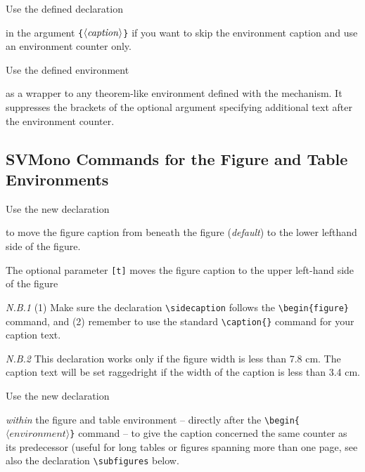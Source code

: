 \documentclass[graybox,square]{svmono}
\begin{document}
\begin{sloppy}
Use the defined declaration
\cprotect\boxtext{\verb|\nocaption|}

in the argument \verb|{|$\langle {\it caption}\rangle$\verb|}| if you want to skip the environment caption and use an environment counter only.

Use the defined environment
\cprotect{}

as a wrapper to any theorem-like environment defined with the mechanism. It suppresses the brackets of the optional argument specifying additional text after the environment counter.

\eject

\subsection{SVMono Commands for the Figure and Table Environments}

Use the new declaration

\cprotect{}

to move the figure caption from beneath the figure ({\it default}) to the lower lefthand side of the figure.

The optional parameter \verb|[t]| moves the figure caption to the upper left-hand side of the figure

{\it N.B.1} (1) Make sure the declaration \verb|\sidecaption| follows the \verb|\begin{figure}| command, and (2) remember to use the standard \verb|\caption{}| command for your caption text.

{\it N.B.2} This declaration works only if the figure width is less than 7.8 cm. The caption text will be set raggedright if the width of the caption is less than 3.4 cm.

Use the new declaration

\cprotect\boxtext{\verb|\samenumber|}

{\it within} the figure and table environment -- directly after the \verb|\begin{|$\langle environment\rangle$\verb|}| command -- to give the caption concerned the same counter as its predecessor (useful for long tables or figures spanning more than one page, see also the declaration \verb|\subfigures| below.


\end{sloppy}
\end{document}

